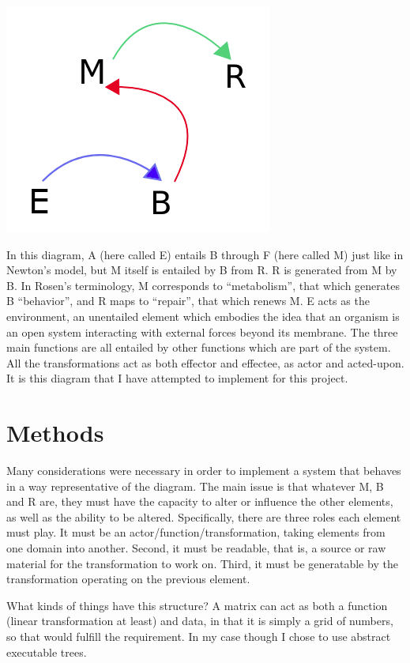 \documentclass[12pt]{article}
\begin{document}
\begin{center}
\includegraphics[scale=0.6]{rosen.png}
\end{center}

In this diagram, A (here called E) entails B through F (here called M) just like in Newton's model, but M itself is entailed by B from R.  R is generated from M by B.  In Rosen's terminology, M corresponds to ``metabolism'', that which generates B ``behavior'', and R maps to ``repair'', that which renews M.  E acts as the environment, an unentailed element which embodies the idea that an organism is an open system interacting with external forces beyond its membrane.  The three main functions are all entailed by other functions which are part of the system.  All the transformations act as both effector and effectee, as actor and acted-upon.  It is this diagram that I have attempted to implement for this project.

\section{Methods}

Many considerations were necessary in order to implement a system that behaves in a way representative of the diagram.  The main issue is that whatever M, B and R are, they must have the capacity to alter or influence the other elements, as well as the ability to be altered.  Specifically, there are three roles each element must play.  It must be an actor/function/transformation, taking elements from one domain into another.  Second, it must be readable, that is, a source or raw material for the transformation to work on.  Third, it must be generatable by the transformation operating on the previous element.  

What kinds of things have this structure?  A matrix can act as both a function (linear transformation at least) and data, in that it is simply a grid of numbers, so that would fulfill the requirement.  In my case though I chose to use abstract executable trees.  
\end{document}
